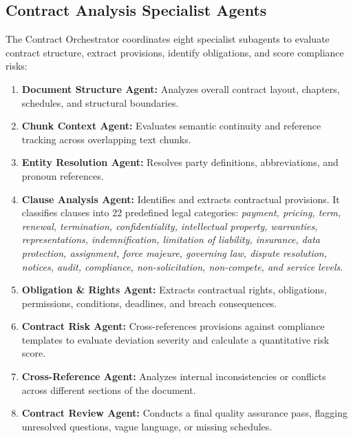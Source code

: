 \subsection{Contract Analysis Specialist Agents}
The Contract Orchestrator coordinates eight specialist subagents to evaluate contract structure, extract provisions, identify obligations, and score compliance risks:
\begin{enumerate}
\item \textbf{Document Structure Agent:} Analyzes overall contract layout, chapters, schedules, and structural boundaries.
\item \textbf{Chunk Context Agent:} Evaluates semantic continuity and reference tracking across overlapping text chunks.
\item \textbf{Entity Resolution Agent:} Resolves party definitions, abbreviations, and pronoun references.
\item \textbf{Clause Analysis Agent:} Identifies and extracts contractual provisions. It classifies clauses into 22 predefined legal categories: \emph{payment, pricing, term, renewal, termination, confidentiality, intellectual property, warranties, representations, indemnification, limitation of liability, insurance, data protection, assignment, force majeure, governing law, dispute resolution, notices, audit, compliance, non-solicitation, non-compete, and service levels}.
\item \textbf{Obligation \& Rights Agent:} Extracts contractual rights, obligations, permissions, conditions, deadlines, and breach consequences.
\item \textbf{Contract Risk Agent:} Cross-references provisions against compliance templates to evaluate deviation severity and calculate a quantitative risk score.
\item \textbf{Cross-Reference Agent:} Analyzes internal inconsistencies or conflicts across different sections of the document.
\item \textbf{Contract Review Agent:} Conducts a final quality assurance pass, flagging unresolved questions, vague language, or missing schedules.
\end{enumerate}

